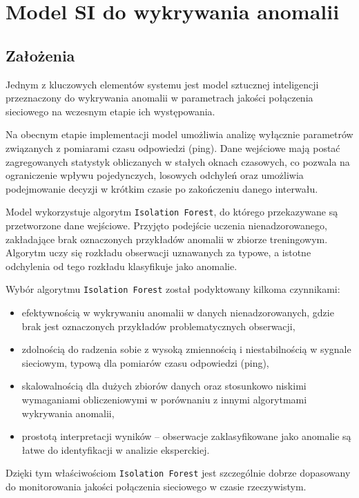 \chapter{Model SI do wykrywania anomalii}
\label{chap:ai-model}

\section{Założenia}

Jednym z kluczowych elementów systemu jest model sztucznej inteligencji przeznaczony do wykrywania anomalii w parametrach jakości połączenia sieciowego na wczesnym etapie ich występowania.

Na obecnym etapie implementacji model umożliwia analizę wyłącznie parametrów związanych z pomiarami czasu odpowiedzi (ping). Dane wejściowe mają postać zagregowanych statystyk obliczanych w stałych oknach czasowych, co pozwala na ograniczenie wpływu pojedynczych, losowych odchyleń oraz umożliwia podejmowanie decyzji w krótkim czasie po zakończeniu danego interwału.

Model wykorzystuje algorytm \texttt{Isolation Forest}, do którego przekazywane są przetworzone dane wejściowe. Przyjęto podejście uczenia nienadzorowanego, zakładające brak oznaczonych przykładów anomalii w zbiorze treningowym. Algorytm uczy się rozkładu obserwacji uznawanych za typowe, a istotne odchylenia od tego rozkładu klasyfikuje jako anomalie.

Wybór algorytmu \texttt{Isolation Forest} został podyktowany kilkoma czynnikami: 
\begin{itemize}
	\item efektywnością w wykrywaniu anomalii w danych nienadzorowanych, gdzie brak jest oznaczonych przykładów problematycznych obserwacji, 
	\item zdolnością do radzenia sobie z wysoką zmiennością i niestabilnością w sygnale sieciowym, typową dla pomiarów czasu odpowiedzi (ping), 
	\item skalowalnością dla dużych zbiorów danych oraz stosunkowo niskimi wymaganiami obliczeniowymi w porównaniu z innymi algorytmami wykrywania anomalii, 
	\item prostotą interpretacji wyników – obserwacje zaklasyfikowane jako anomalie są łatwe do identyfikacji w analizie eksperckiej.
\end{itemize}
Dzięki tym właściwościom \texttt{Isolation Forest} jest szczególnie dobrze dopasowany do monitorowania jakości połączenia sieciowego w czasie rzeczywistym.

